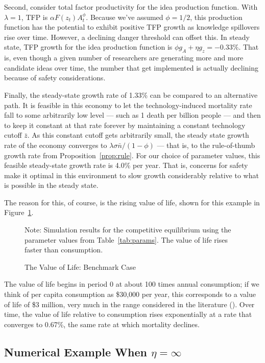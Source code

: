 \documentclass[12pt,twoside]{article}
\newcommand{\cnp}[1]{(\citealt{#1})}  %
\newcommand{\fignote}[2]{\begin{center}\parbox[c]{#1}{\footnotesize #2} \end{center}}
\begin{document}
Second, consider total factor productivity for the idea production
function. With $\lambda=1$, TFP is $\alpha F(z_t) A_t ^\phi$. Because
we've assumed $\phi=1/2$, this production function has the potential to
exhibit positive TFP growth as knowledge spillovers rise over time.
However, a declining danger threshold can offset this. In steady state,
TFP growth for the idea production function is $\phi g_A + \eta
g_z=-0.33\%$. That is, even though a given number of researchers are
generating more and more candidate ideas over time, the number that get
implemented is actually declining because of safety considerations.

Finally, the steady-state growth rate of 1.33\% can be compared to an
alternative path. It is feasible in this economy to let the
technology-induced mortality rate fall to some arbitrarily low level ---
such as 1 death per billion people --- and then to keep it constant at
that rate forever by maintaining a constant technology cutoff $\bar{z}$.
As this constant cutoff gets arbitrarily small, the steady state growth
rate of the economy converges to $\lambda \sigma \bar{n}/(1-\phi)$ ---
that is, to the rule-of-thumb growth rate from
Proposition~\ref{prop:rule}. For our choice of parameter values, this
feasible steady-state growth rate is 4.0\% per year. That is, concerns
for safety make it optimal in this environment to slow growth
considerably relative to what is possible in the steady state.

The reason for this, of course, is the rising value of life, shown for
this example in Figure~\ref{fig:v}.
\begin{figure}[tp]
\caption{The Value of Life: Benchmark Case}
\label{fig:v}
\fignote{4.5in}{Note: Simulation results for the competitive equilibrium
using the parameter values from Table~\ref{tab:params}.  The value of
life rises faster than consumption.}
\end{figure} 
The value of life begins in period 0 at about 100 times annual
consumption; if we think of per capita consumption as \$30,000 per year,
this corresponds to a value of life of \$3 million, very much in the
range considered in the literature
\cnp{ViscusiAldy2003,AshenfelterGreenstone2004,MurphyTopel2005}. Over
time, the value of life relative to consumption rises exponentially at a
rate that converges to 0.67\%, the same rate at which mortality
declines.


\subsection{Numerical Example When $\eta=\infty$}
\end{document}
